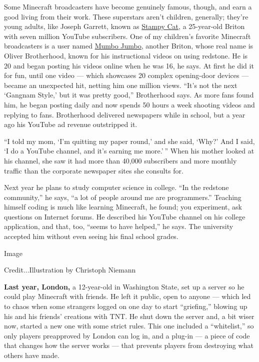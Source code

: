 Some Minecraft broadcasters have become genuinely famous, though, and
earn a good living from their work. These superstars aren't children,
generally; they're young adults, like Joseph Garrett, known as
\href{https://www.youtube.com/channel/UCj5i58mCkAREDqFWlhaQbOw?nohtml5=False}{Stampy
Cat}, a 25-year-old Briton with seven million YouTube subscribers. One
of my children's favorite Minecraft broadcasters is a user named
\href{https://www.youtube.com/user/ThatMumboJumbo?nohtml5=False}{Mumbo
Jumbo}, another Briton, whose real name is Oliver Brotherhood, known for
his instructional videos on using redstone. He is 20 and began posting
his videos online when he was 16, he says. At first he did it for fun,
until one video --- which showcases 20 complex opening-­door devices ---
became an unexpected hit, netting him one million views. ``It's not the
next `Gangnam Style,' but it was pretty good,'' Brotherhood says. As
more fans found him, he began posting daily and now spends 50 hours a
week shooting videos and replying to fans. Brotherhood delivered
newspapers while in school, but a year ago his YouTube ad revenue
outstripped it.

``I told my mom, `I'm quitting my paper round,' and she said, `Why?' And
I said, `I do a YouTube channel, and it's earning me more.' '' When his
mother looked at his channel, she saw it had more than 40,000
subscribers and more monthly traffic than the corporate newspaper sites
she consults for.

Next year he plans to study computer science in college. ``In the
redstone community,'' he says, ``a lot of people around me are
programmers.'' Teaching himself coding is much like learning Minecraft,
he found; you experiment, ask questions on Internet forums. He described
his YouTube channel on his college application, and that, too, ``seems
to have helped,'' he says. The university accepted him without even
seeing his final school grades.

Image

Credit...Illustration by Christoph Niemann

\textbf{Last year, London,} a 12-year-old in Washington State, set up a
server so he could play Minecraft with friends. He left it public, open
to anyone --- which led to chaos when some strangers logged on one day
to start ``griefing,'' blowing up his and his friends' creations with
TNT. He shut down the server and, a bit wiser now, started a new one
with some strict rules. This one included a ``whitelist,'' so only
players pre­approved by London can log in, and a plug-in --- a piece of
code that changes how the server works --- that prevents players from
destroying what others have made.

